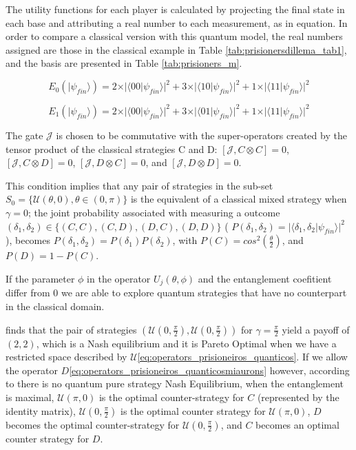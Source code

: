 The utility functions for each player is calculated by projecting the final state in each base and attributing a real number to each measurement, as in equation.
In order to compare a classical version with this quantum model, the real numbers assigned are those in the classical example in Table \ref{tab:prisionersdillema_tab1}, and the basis are presented in Table \ref{tab:prisioners_m}.

\begin{equation}
E_{0}(\vert\psi_{fin}\rangle)=2\times\vert\langle00\vert\psi_{fin}\rangle\vert^{2}+3\times\vert\langle10\vert\psi_{fin}\rangle\vert^{2}+1\times\vert\langle11\vert\psi_{fin}\rangle\vert^{2}
\end{equation}


\begin{equation}
E_{1}(\vert\psi_{fin}\rangle)=2\times\vert\langle00\vert\psi_{fin}\rangle\vert^{2}+3\times\vert\langle01\vert\psi_{fin}\rangle\vert^{2}+1\times\vert\langle11\vert\psi_{fin}\rangle\vert^{2}
\end{equation}



The gate $\mathcal{J}$ is chosen to be commutative with the super-operators created by the tensor product of the classical strategies C and D: $ [ \mathcal{J} , C \otimes C ] = 0 $, $ [ \mathcal{J} , C \otimes D ] = 0 $, $ [ \mathcal{J} , D \otimes C ] = 0 $, and $ [ \mathcal{J} , D \otimes D ] = 0 $. 

This condition implies that any pair of strategies in the sub-set $S_{0} = \{ \mathcal{U} ( \theta , 0) , \theta \in (0, \pi) \}$ is the equivalent of a classical mixed strategy when $\gamma = 0$; the joint probability associated with measuring a outcome $(\delta_{1}, \delta_{2}) \in \{ (C, C), (C, D), (D, C), (D, D) \} $ ( $ P( \delta_{1} , \delta_{2} ) = { \vert \langle \delta_{1} , \delta_{2} \vert \psi_{fin} \rangle \vert }^{2} $ ), becomes $ P( \delta_{1} , \delta_{2} ) =P( \delta_{1} ) P( \delta_{2})$, with $P(C) = cos^{2}(\frac{ \theta }{2})$, and $P(D) = 1 - P(C)$\cite{Eisert2008}.

If the parameter $\phi$ in the operator $U_{j}(\theta ,\phi)$ and the entanglement coefitient differ from $0$ we are able to explore quantum strategies that have no counterpart in the classical domain.

\cite{Eisert2008} finds that the pair of strategies $( \mathcal{U}( 0 , \frac{\pi}{2}), \mathcal{U}( 0 , \frac{\pi}{2}))$ for $\gamma = \frac{\pi}{2}$ yield  a payoff of $(2,2)$, which is a Nash equilibrium and it is Pareto Optimal when we have a restricted space described by $\mathcal{U}$\ref{eq:operators_prisioneiros_quanticos}. If we allow the operator $D$\ref{eq:operators_prisioneiros_quanticosmiaurons} however, according to \cite{Letters2002} there is no quantum pure strategy Nash Equilibrium, when the entanglement is maximal, $\mathcal{U}(\pi, 0)$ is the optimal counter-strategy for $C$ (represented by the identity matrix), $\mathcal{U}(0, \frac{\pi}{2})$ is the optimal counter strategy for $\mathcal{U}(\pi, 0)$, $D$ becomes the optimal counter-strategy for $\mathcal{U}(0, \frac{\pi}{2})$, and $C$ becomes an optimal counter strategy for $D$\cite{Du}.




